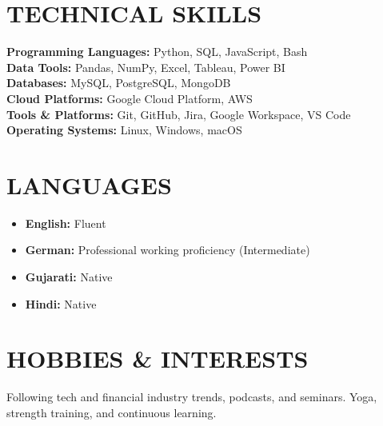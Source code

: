 \documentclass[11pt,a4paper]{article}
\newcommand{\cvitem}[1]{
    \item #1
}
\begin{document}
\section{TECHNICAL SKILLS}

\noindent
\textbf{Programming Languages:} Python, SQL, JavaScript, Bash \\
\textbf{Data Tools:} Pandas, NumPy, Excel, Tableau, Power BI \\
\textbf{Databases:} MySQL, PostgreSQL, MongoDB \\
\textbf{Cloud Platforms:} Google Cloud Platform, AWS \\
\textbf{Tools \& Platforms:} Git, GitHub, Jira, Google Workspace, VS Code \\
\textbf{Operating Systems:} Linux, Windows, macOS

\section{LANGUAGES}

\begin{itemize}[leftmargin=15pt, itemsep=3pt]
    \cvitem{\textbf{English:} Fluent}
    \cvitem{\textbf{German:} Professional working proficiency (Intermediate)}
    \cvitem{\textbf{Gujarati:} Native}
    \cvitem{\textbf{Hindi:} Native}
\end{itemize}

\section{HOBBIES \& INTERESTS}

Following tech and financial industry trends, podcasts, and seminars. Yoga, strength training, and continuous learning.
\end{document}

